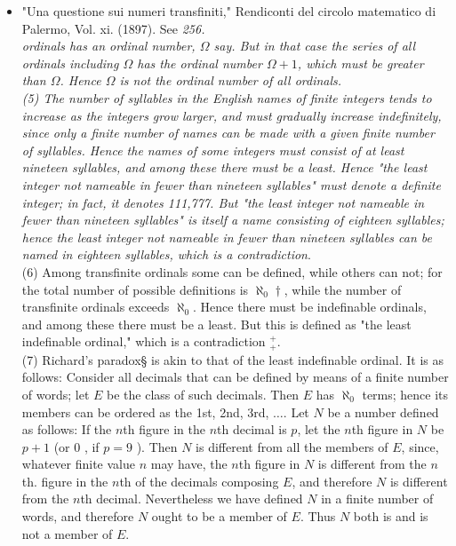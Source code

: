 \documentclass[10pt]{article}
\begin{document}
\begin{itemize}
  \item "Una questione sui numeri transfiniti," Rendiconti del circolo matematico di Palermo, Vol. xi. (1897). See \textit{256.\\
ordinals has an ordinal number, $\Omega$ say. But in that case the series of all ordinals including $\Omega$ has the ordinal number $\Omega+1$, which must be greater than $\Omega$. Hence $\Omega$ is not the ordinal number of all ordinals.\\
(5) The number of syllables in the English names of finite integers tends to increase as the integers grow larger, and must gradually increase indefinitely, since only a finite number of names can be made with a given finite number of syllables. Hence the names of some integers must consist of at least nineteen syllables, and among these there must be a least. Hence "the least integer not nameable in fewer than nineteen syllables" must denote a definite integer; in fact, it denotes 111,777. But "the least integer not nameable in fewer than nineteen syllables" is itself a name consisting of eighteen syllables; hence the least integer not nameable in fewer than nineteen syllables can be named in eighteen syllables, which is a contradiction}.\\
(6) Among transfinite ordinals some can be defined, while others can not; for the total number of possible definitions is $\aleph_{0} \dagger$, while the number of transfinite ordinals exceeds $\aleph_{0}$. Hence there must be indefinable ordinals, and among these there must be a least. But this is defined as "the least indefinable ordinal," which is a contradiction ${ }_{+}^{+}$.\\
(7) Richard's paradox§ is akin to that of the least indefinable ordinal. It is as follows: Consider all decimals that can be defined by means of a finite number of words; let $E$ be the class of such decimals. Then $E$ has $\boldsymbol{\aleph}_{0}$ terms; hence its members can be ordered as the 1st, 2nd, 3rd, $\ldots$. Let $N$ be a number defined as follows: If the $n$th figure in the $n$th decimal is $p$, let the $n$th figure in $N$ be $p+1$ (or 0 , if $p=9$ ). Then $N$ is different from all the members of $E$, since, whatever finite value $n$ may have, the $n$th figure in $N$ is different from the $n$ th. figure in the $n$th of the decimals composing $E$, and therefore $N$ is different from the $n$th decimal. Nevertheless we have defined $N$ in a finite number of words, and therefore $N$ ought to be a member of $E$. Thus $N$ both is and is not a member of $E$.
\end{itemize}
\end{document}
